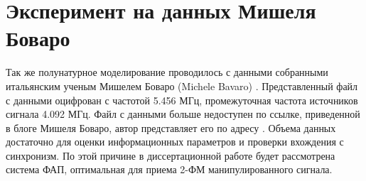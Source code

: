 %
%
%


\section{Эксперимент на данных Мишеля Боваро}

Так же полунатурное моделирование проводилось с данными собранными итальянским ученым Мишелем Боваро (Michele Bavaro) \cite{bovaro_blog}. Представленный файл с данными оцифрован
с частотой 5.456 МГц, промежуточная частота источников сигнала 4.092 МГц. Файл с данными больше недоступен по ссылке, приведенной в блоге Мишеля Боваро,
автор представляет его по адресу \cite{rflab_primo}.
Объема данных достаточно для оценки информационных параметров и проверки вхождения с синхронизм. По этой причине в диссертационной работе будет
рассмотрена система ФАП, оптимальная для приема 2-ФМ манипулированного сигнала.

